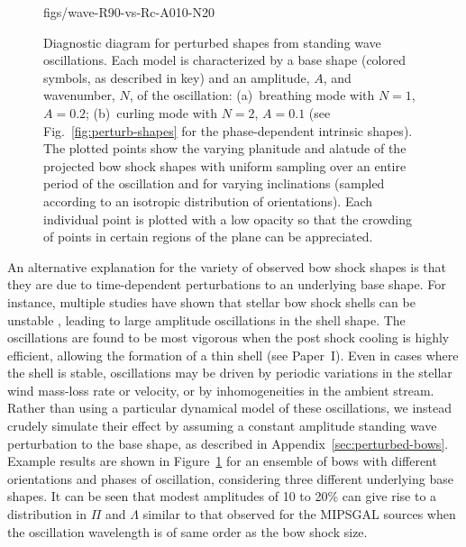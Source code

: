 \begin{figure}
  {figs/wave-R90-vs-Rc-A010-N20}
  \caption{Diagnostic diagram for perturbed shapes from standing wave
    oscillations.  Each model is characterized by a base shape
    (colored symbols, as described in key) and an amplitude, \(A\),
    and wavenumber, \(N\), of the oscillation: (a)~breathing mode with
    \(N = 1\), \(A = 0.2\); (b)~curling mode with \(N = 2\),
    \(A = 0.1\) (see Fig.~\ref{fig:perturb-shapes} for the
    phase-dependent intrinsic shapes).  The plotted points show the
    varying planitude and alatude of the projected bow shock shapes
    with uniform sampling over an entire period of the oscillation and
    for varying inclinations (sampled according to an isotropic
    distribution of orientations).  Each individual point is plotted
    with a low opacity so that the crowding of points in certain
    regions of the plane can be appreciated.}
  \label{fig:perturb-Rc-R90}
\end{figure}

An alternative explanation for the variety of observed bow shock
shapes is that they are due to time-dependent perturbations to an
underlying base shape.  For instance, multiple studies have shown that
stellar bow shock shells can be unstable \citep{Dgani:1996a,
  Dgani:1996b, Blondin:1998a, Comeron:1998a, Meyer:2014a}, leading to
large amplitude oscillations in the shell shape.  The oscillations are
found to be most vigorous when the post shock cooling is highly
efficient, allowing the formation of a thin shell (see Paper~I).  Even
in cases where the shell is stable, oscillations may be driven by
periodic variations in the stellar wind mass-loss rate or velocity, or
by inhomogeneities in the ambient stream.  Rather than using a
particular dynamical model of these oscillations, we instead crudely
simulate their effect by assuming a constant amplitude standing wave
perturbation to the base shape, as described in
Appendix~\ref{sec:perturbed-bows}.  Example results are shown in
Figure~\ref{fig:perturb-Rc-R90} for an ensemble of bows with different
orientations and phases of oscillation, considering three different
underlying base shapes.  It can be seen that modest amplitudes of 10
to 20\% can give rise to a distribution in \(\Pi\) and \(\Lambda\) similar to
that observed for the MIPSGAL sources when the oscillation wavelength
is of same order as the bow shock size.

